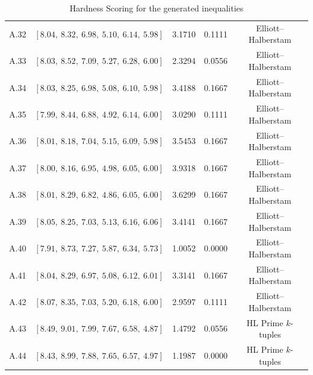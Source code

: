 \documentclass[11pt,reqno]{amsart}
\theoremstyle{plain}\newtheorem{theorem}{Theorem}[section]
\numberwithin{equation}{section}
\begin{document}
\begin{table}[ht]
\begin{center}
\begin{tabular}{|c|c|c|c|c|}
A.32 & $[8.04,\ 8.32,\ 6.98,\ 5.10,\ 6.14,\ 5.98]$ & 3.1710 & 0.1111 & Elliott--Halberstam \\
A.33 & $[8.03,\ 8.52,\ 7.09,\ 5.27,\ 6.28,\ 6.00]$ & 2.3294 & 0.0556 & Elliott--Halberstam \\
A.34 & $[8.03,\ 8.25,\ 6.98,\ 5.08,\ 6.10,\ 5.98]$ & 3.4188 & 0.1667 & Elliott--Halberstam\\
A.35 & $[7.99,\ 8.44,\ 6.88,\ 4.92,\ 6.14,\ 6.00]$ & 3.0290 & 0.1111 & Elliott--Halberstam \\
A.36 & $[8.01,\ 8.18,\ 7.04,\ 5.15,\ 6.09,\ 5.98]$ & 3.5453 & 0.1667 & Elliott--Halberstam \\
A.37 & $[8.00,\ 8.16,\ 6.95,\ 4.98,\ 6.05,\ 6.00]$ & 3.9318 & 0.1667 & Elliott--Halberstam\\
A.38 & $[8.01,\ 8.29,\ 6.82,\ 4.86,\ 6.05,\ 6.00]$ & 3.6299 & 0.1667 & Elliott--Halberstam \\
A.39 & $[8.05,\ 8.25,\ 7.03,\ 5.13,\ 6.16,\ 6.06]$ & 3.4141 & 0.1667 & Elliott--Halberstam  \\
A.40 & $[7.91,\ 8.73,\ 7.27,\ 5.87,\ 6.34,\ 5.73]$ & 1.0052 & 0.0000 & Elliott--Halberstam \\
A.41 & $[8.04,\ 8.29,\ 6.97,\ 5.08,\ 6.12,\ 6.01]$ & 3.3141 & 0.1667 & Elliott--Halberstam \\
A.42 & $[8.07,\ 8.35,\ 7.03,\ 5.20,\ 6.18,\ 6.00]$ & 2.9597 & 0.1111 & Elliott--Halberstam  \\
A.43 & $[8.49,\ 9.01,\ 7.99,\ 7.67,\ 6.58,\ 4.87]$ & 1.4792 & 0.0556 & HL Prime $k$-tuples \\
A.44 & $[8.43,\ 8.99,\ 7.88,\ 7.65,\ 6.57,\ 4.97]$ & 1.1987 & 0.0000 & HL Prime $k$-tuples \\
\hline
\end{tabular}
\end{center}
\caption{Hardness Scoring for the generated inequalities}
\label{benchmarktable1}
\end{table}
\end{document}
